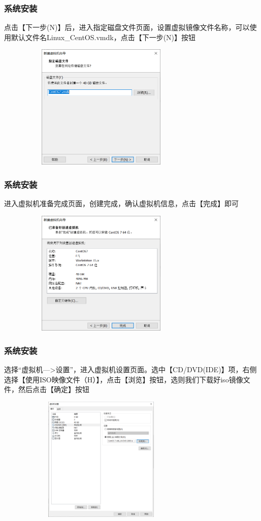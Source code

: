 \documentclass[notheorems,serif]{beamer}
\begin{document}
\begin{frame}
\frametitle{系统安装}
点击【下一步(N)】后，进入指定磁盘文件页面，设置虚拟镜像文件名称，可以使用默认文件名Linux\_CentOS.vmdk，点击【下一步(N)】按钮
\begin{figure}
 \centering
 \includegraphics[width=8cm,height=6cm]{./figures/图片21.png}
\end{figure}
\end{frame}

\begin{frame}
\frametitle{系统安装}
进入虚拟机准备完成页面，创建完成，确认虚拟机信息，点击【完成】即可
\begin{figure}
 \centering
 \includegraphics[width=8cm,height=6cm]{./figures/图片22.png}
\end{figure}
\end{frame}

\begin{frame}
\frametitle{系统安装}
选择“虚拟机--->设置”，进入虚拟机设置页面。选中【CD/DVD(IDE)】项，右侧选择【使用ISO映像文件（H）】，点击【浏览】按钮，选则我们下载好iso镜像文件，然后点击【确定】按钮
\begin{figure}
 \centering
 \includegraphics[width=8cm,height=6cm]{./figures/图片23.png}
\end{figure}
\end{frame}
\end{document}
